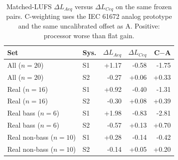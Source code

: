 \begin{table}[!htbp]
\centering
\caption{Matched-LUFS $\Delta L_{Aeq}$ versus $\Delta L_{Ceq}$ on the same frozen pairs. C-weighting uses the IEC 61672 analog prototype and the same uncalibrated offset as A. Positive: processor worse than flat gain.}
\label{tab:cweight}
\renewcommand{\arraystretch}{1.12}
\begin{tabular}{l l r r r}
\hline
Set & Sys. & $\Delta L_{Aeq}$ & $\Delta L_{Ceq}$ & C$-$A \\
\hline
All ($n{=}20$) & S1 & +1.17 & -0.58 & -1.75 \\
All ($n{=}20$) & S2 & -0.27 & +0.06 & +0.33 \\
Real ($n{=}16$) & S1 & +0.92 & -0.40 & -1.31 \\
Real ($n{=}16$) & S2 & -0.30 & +0.08 & +0.39 \\
Real bass ($n{=}6$) & S1 & +1.98 & -0.83 & -2.81 \\
Real bass ($n{=}6$) & S2 & -0.57 & +0.13 & +0.70 \\
Real non-bass ($n{=}10$) & S1 & +0.28 & -0.14 & -0.42 \\
Real non-bass ($n{=}10$) & S2 & -0.14 & +0.05 & +0.20 \\
\hline
\end{tabular}
\end{table}
